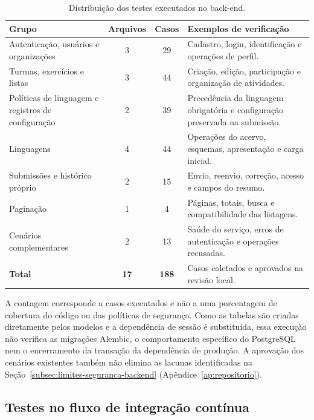 \begin{table}[htbp]
\centering
\caption{Distribuição dos testes executados no back-end.}
\label{tab:testes-backend}
\small
\renewcommand{\arraystretch}{1.15}
\begin{tabular}{|>{\raggedright\arraybackslash}p{}|c|c|>{\raggedright\arraybackslash}p{}|}
\hline
\textbf{Grupo} & \textbf{Arquivos} & \textbf{Casos} & \textbf{Exemplos de verificação} \\\hline
Autenticação, usuários e organizações & 3 & 29 & Cadastro, login, identificação e operações de perfil. \\\hline
Turmas, exercícios e listas & 3 & 44 & Criação, edição, participação e organização de atividades. \\\hline
Políticas de linguagem e registros de configuração & 2 & 39 & Precedência da linguagem obrigatória e configuração preservada na submissão. \\\hline
Linguagens & 4 & 44 & Operações do acervo, esquemas, apresentação e carga inicial. \\\hline
Submissões e histórico próprio & 2 & 15 & Envio, reenvio, correção, acesso e campos do resumo. \\\hline
Paginação & 1 & 4 & Páginas, totais, busca e compatibilidade das listagens. \\\hline
Cenários complementares & 2 & 13 & Saúde do serviço, erros de autenticação e operações recusadas. \\\hline
\textbf{Total} & \textbf{17} & \textbf{188} & Casos coletados e aprovados na revisão local. \\\hline
\end{tabular}
\end{table}
\FloatBarrier

A contagem corresponde a casos executados e não a uma porcentagem de cobertura do código ou das políticas de segurança. Como as tabelas são criadas diretamente pelos modelos e a dependência de sessão é substituída, essa execução não verifica as migrações Alembic, o comportamento específico do PostgreSQL nem o encerramento da transação da dependência de produção. A aprovação dos cenários existentes também não elimina as lacunas identificadas na Seção~\ref{subsec:limites-seguranca-backend} (Apêndice~\ref{ap:repositorio}).

\subsection{Testes no fluxo de integração contínua}
\label{subsec:ci-backend}

